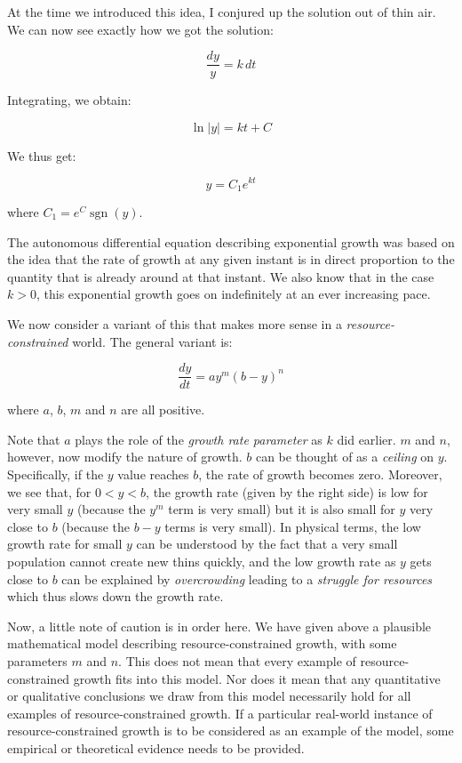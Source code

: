 \documentclass{amsart}
\begin{document}
At the time we introduced this idea, I conjured up the solution out of
thin air. We can now see exactly how we got the solution:

$$\frac{dy}{y} = k \, dt$$

Integrating, we obtain:

$$\ln|y| = kt + C$$

We thus get:

$$y = C_1e^{kt}$$

where $C_1 = e^C \operatorname{sgn}(y)$.

The autonomous differential equation describing exponential growth was
based on the idea that the rate of growth at any given instant is in
direct proportion to the quantity that is already around at that
instant. We also know that in the case $k > 0$, this exponential
growth goes on indefinitely at an ever increasing pace.

We now consider a variant of this that makes more sense in a {\em
resource-constrained} world. The general variant is:

$$\frac{dy}{dt} = ay^m(b - y)^n$$

where $a$, $b$, $m$ and $n$ are all positive.

Note that $a$ plays the role of the {\em growth rate parameter} as $k$
did earlier. $m$ and $n$, however, now modify the nature of
growth. $b$ can be thought of as a {\em ceiling} on $y$. Specifically,
if the $y$ value reaches $b$, the rate of growth becomes
zero. Moreover, we see that, for $0 < y < b$, the growth rate (given
by the right side) is low for very small $y$ (because the $y^m$ term
is very small) but it is also small for $y$ very close to $b$ (because
the $b - y$ terms is very small). In physical terms, the low growth
rate for small $y$ can be understood by the fact that a very small
population cannot create new thins quickly, and the low growth rate as
$y$ gets close to $b$ can be explained by {\em overcrowding} leading
to a {\em struggle for resources} which thus slows down the growth
rate.

Now, a little note of caution is in order here. We have given above a
plausible mathematical model describing resource-constrained growth,
with some parameters $m$ and $n$. This does not mean that every
example of resource-constrained growth fits into this model. Nor does
it mean that any quantitative or qualitative conclusions we draw from
this model necessarily hold for all examples of resource-constrained
growth. If a particular real-world instance of resource-constrained
growth is to be considered as an example of the model, some empirical
or theoretical evidence needs to be provided.
\end{document}
